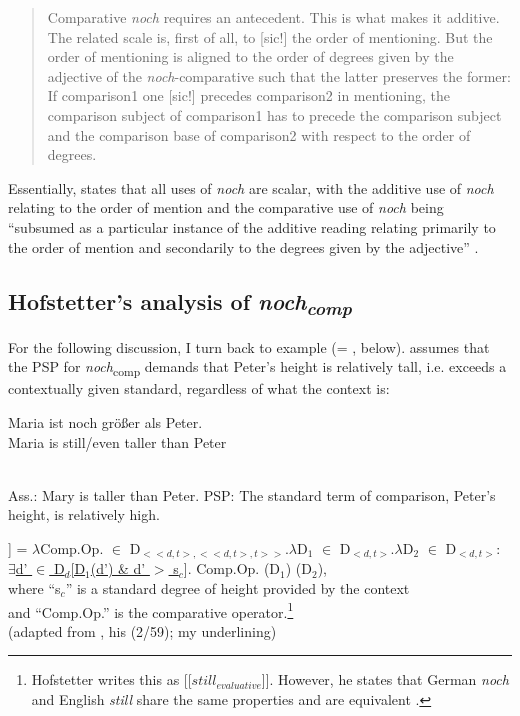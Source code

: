 \documentclass[output=paper,
modfonts
]{langscibook}
\begin{document}
    \begin{quote}
    Comparative \textit{noch} requires an antecedent. This is what makes it additive. The related scale is, first of all, to [sic!] the order of mentioning. But the order of mentioning is aligned to the order of degrees given by the adjective of the \textit{noch}-comparative such that the latter preserves the former: If comparison1 one [sic!] precedes comparison2 in mentioning, the comparison subject of comparison1 has to precede the comparison subject and the comparison base of comparison2 with respect to the order of degrees. \citep[p.13]{umbach2009a_comp}
    \end{quote}


\noindent Essentially, \citeauthor{umbach2009a_comp} states that all uses of \textit{noch} are scalar, with the additive use of \textit{noch} relating to the order of mention and the comparative use of \textit{noch} being ``subsumed as a particular instance of the additive reading relating primarily to the order of mention and secondarily to the degrees given by the adjective'' \citep[p.14]{umbach2009a_comp}.

\subsection{Hofstetter's \citeyearpar{Hofstetter2013} analysis of \textit{noch\textsubscript{comp}}}

For the following discussion, I turn back to example  (= , below). \citet{Hofstetter2013} assumes that the PSP for \textit{noch}\textsubscript{comp} demands that Peter's height is relatively tall, i.e. exceeds a contextually given standard, regardless of what the context is:

\ea\gll Maria ist noch größer als Peter.\\
Maria is still/even taller than Peter\\
 \label{NOCH_COMP_EXP_repeat}\\
\z

\ea \label{NOCH_COMP_meaning_components} \ea Ass.: Mary is taller than Peter.
\ex PSP: The standard term of comparison, Peter's height, is relatively high.\label{NOCH_COMP_PSP_00} \\
\z\z

\ea\relax [[noch\textsubscript{comp}]] = $\lambda$Comp.Op. $\in$ D$_{<<d,t>,<<d,t>,t>>}$.$\lambda$D$_1$ $\in$ D$_{<d,t>}$.$\lambda$D$_2$ $\in$ D$_{<d,t>}$: \\\underline{$\exists$d' $\in$ D$_d$[D$_1$(d') \& d' $>$ s$_c$}]. Comp.Op. (D$_1$) (D$_2$),\\ where ``s$_c$'' is a standard degree of height provided by the context \\and ``Comp.Op.'' is the comparative operator.\footnote{ Hofstetter writes this as [[$still_{evaluative}$]]. However, he states that German \textit{noch} and English \textit{still} share the same properties and are equivalent \citep[31]{Hofstetter2013}.} \label{HS_entry_comp} 
\\ (adapted from \citeauthor{Hofstetter2013} \citeyearpar{Hofstetter2013}, his (2/59); my underlining)\z
\end{document}
